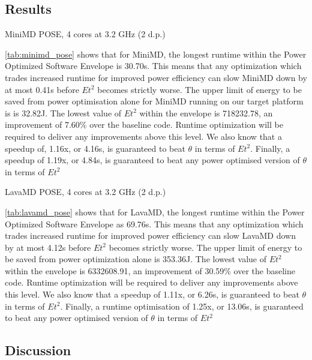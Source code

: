 \subsection{Results}

\begin{table}
\centering
\caption{MiniMD POSE, 4 cores at 3.2 GHz (2 d.p.)}

\label{tab:minimd_pose}
\end{table} 

\autoref{tab:minimd_pose} shows that for MiniMD, the longest runtime within the Power Optimized Software Envelope is 30.70s.
This means that any optimization which trades increased runtime for improved power efficiency can slow MiniMD down by at most 0.41s before $Et^2$ becomes strictly worse.
The upper limit of energy to be saved from power optimisation alone for MiniMD running on our target platform is is 32.82J.
The lowest value of $Et^2$ within the envelope is 718232.78, an improvement of 7.60\% over the baseline code. 
Runtime optimization will be required to deliver any improvements above this level.
We also know that a speedup of, 1.16x, or 4.16s, is guaranteed to beat $\theta$ in terms of $Et^2$.
Finally, a speedup of 1.19x, or 4.84s, is guaranteed to beat any power optimised version of $\theta$ in terms of $Et^2$

\begin{table}
\centering
\caption{LavaMD POSE, 4 cores at 3.2 GHz (2 d.p.)}

\label{tab:lavamd_pose}
\end{table} 

\autoref{tab:lavamd_pose} shows that for LavaMD, the longest runtime within the Power Optimized Software Envelope as 69.76s.
This means that any optimization which trades increased runtime for improved power efficiency can slow LavaMD down by at most 4.12s before $Et^2$ becomes strictly worse.
The upper limit of energy to be saved from power optimization alone is 353.36J.
The lowest value of $Et^2$ within the envelope is 6332608.91, an improvement of 30.59\% over the baseline code.
Runtime optimization will be required to deliver any improvements above this level.
We also know that a speedup of 1.11x, or 6.26s, is guaranteed to beat $\theta$ in terms of $Et^2$.
Finally, a runtime optimisation of 1.25x, or 13.06s, is guaranteed to beat any power optimised version of $\theta$ in terms of $Et^2$ 

\subsection{Discussion}

